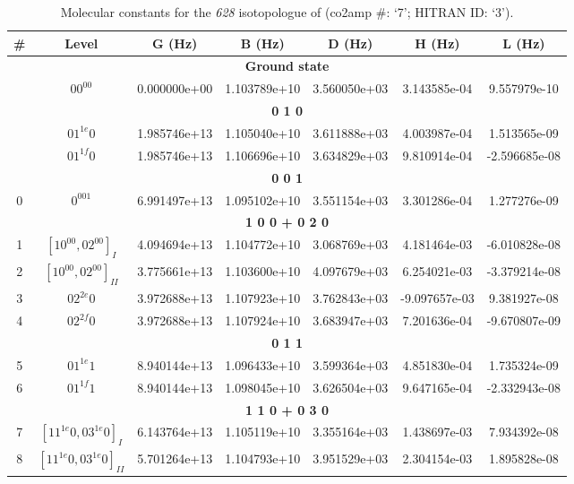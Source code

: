 \begin{table}[h!]
\caption{Molecular constants for the \textit{628} isotopologue of  (co2amp \#: ‘7’; HITRAN ID: ‘3’).}
\label{table:constants_628}
\centering
\begin{tabular}{|c|c|c|c|c|c|c|}
\hline
\textbf{\#} & \textbf{Level} & \textbf{G (Hz)} & \textbf{B (Hz)} & \textbf{D (Hz)} & \textbf{H (Hz)} & \textbf{L (Hz)} \\ \hline
\multicolumn{7}{|c|}{\textbf{Ground state}} \\ \hline
 & $00^00$ & 0.000000e+00 & 1.103789e+10 & 3.560050e+03 & 3.143585e-04 & 9.557979e-10 \\ \hline
\multicolumn{7}{|c|}{\textbf{0 1 0}} \\ \hline
 & $01^{1e}0$ & 1.985746e+13 & 1.105040e+10 & 3.611888e+03 & 4.003987e-04 & 1.513565e-09 \\ \hline
 & $01^{1f}0$ & 1.985746e+13 & 1.106696e+10 & 3.634829e+03 & 9.810914e-04 & -2.596685e-08 \\ \hline
\multicolumn{7}{|c|}{\textbf{0 0 1}} \\ \hline
0 & $0^001$ & 6.991497e+13 & 1.095102e+10 & 3.551154e+03 & 3.301286e-04 & 1.277276e-09 \\ \hline
\multicolumn{7}{|c|}{\textbf{1 0 0 + 0 2 0}} \\ \hline
1 & $[10^00, 02^00]_{I}$ & 4.094694e+13 & 1.104772e+10 & 3.068769e+03 & 4.181464e-03 & -6.010828e-08 \\ \hline
2 & $[10^00, 02^00]_{II}$ & 3.775661e+13 & 1.103600e+10 & 4.097679e+03 & 6.254021e-03 & -3.379214e-08 \\ \hline
3 & $02^{2e}0$ & 3.972688e+13 & 1.107923e+10 & 3.762843e+03 & -9.097657e-03 & 9.381927e-08 \\ \hline
4 & $02^{2f}0$ & 3.972688e+13 & 1.107924e+10 & 3.683947e+03 & 7.201636e-04 & -9.670807e-09 \\ \hline
\multicolumn{7}{|c|}{\textbf{0 1 1}} \\ \hline
5 & $01^{1e}1$ & 8.940144e+13 & 1.096433e+10 & 3.599364e+03 & 4.851830e-04 & 1.735324e-09 \\ \hline
6 & $01^{1f}1$ & 8.940144e+13 & 1.098045e+10 & 3.626504e+03 & 9.647165e-04 & -2.332943e-08 \\ \hline
\multicolumn{7}{|c|}{\textbf{1 1 0 + 0 3 0}} \\ \hline
7 & $[11^{1e}0, 03^{1e}0]_{I}$ & 6.143764e+13 & 1.105119e+10 & 3.355164e+03 & 1.438697e-03 & 7.934392e-08 \\ \hline
8 & $[11^{1e}0, 03^{1e}0]_{II}$ & 5.701264e+13 & 1.104793e+10 & 3.951529e+03 & 2.304154e-03 & 1.895828e-08 \\ \hline

\end{tabular}
\end{table}
